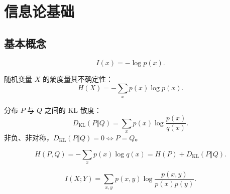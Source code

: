\chapter{信息论基础}

\section{基本概念}

\begin{definition}
\begin{equation}
    I(x) = -\log p(x).
\end{equation}
\end{definition}

\begin{definition}[熵]
随机变量 $X$ 的熵度量其不确定性：
\begin{equation}
    H(X) = -\sum_{x} p(x) \log p(x).
\end{equation}
\end{definition}

\begin{definition}[KL 散度]
分布 $P$ 与 $Q$ 之间的 KL 散度：
\begin{equation}
    D_{\mathrm{KL}}(P \Vert Q) = \sum_{x} p(x) \log\frac{p(x)}{q(x)}.
\end{equation}
非负、非对称，$D_{\mathrm{KL}}(P \Vert Q) = 0 \iff P = Q$。
\end{definition}

\begin{definition}[交叉熵]
\begin{equation}
    H(P, Q) = -\sum_{x} p(x) \log q(x) = H(P) + D_{\mathrm{KL}}(P \Vert Q).
\end{equation}
\end{definition}

\begin{definition}[互信息]
\begin{equation}
    I(X; Y) = \sum_{x, y} p(x, y) \log\frac{p(x, y)}{p(x)p(y)}.
\end{equation}
\end{definition}


